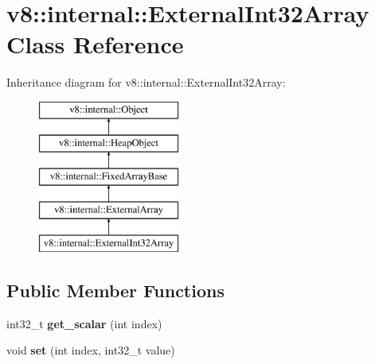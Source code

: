 \hypertarget{classv8_1_1internal_1_1_external_int32_array}{}\section{v8\+:\+:internal\+:\+:External\+Int32\+Array Class Reference}
\label{classv8_1_1internal_1_1_external_int32_array}
Inheritance diagram for v8\+:\+:internal\+:\+:External\+Int32\+Array\+:\begin{figure}[H]
\begin{center}
\leavevmode
\includegraphics[height=5.000000cm]{classv8_1_1internal_1_1_external_int32_array}
\end{center}
\end{figure}
\subsection*{Public Member Functions}
\begin{DoxyCompactItemize}
\item 
\hypertarget{classv8_1_1internal_1_1_external_int32_array_a09f2e466b55506f793af91329ae67e13}{}int32\+\_\+t {\bfseries get\+\_\+scalar} (int index)\label{classv8_1_1internal_1_1_external_int32_array_a09f2e466b55506f793af91329ae67e13}

\item 
\hypertarget{classv8_1_1internal_1_1_external_int32_array_a4355d58d56a6ccd74af3e7c1e3a92d16}{}void {\bfseries set} (int index, int32\+\_\+t value)\label{classv8_1_1internal_1_1_external_int32_array_a4355d58d56a6ccd74af3e7c1e3a92d16}

\end{DoxyCompactItemize}
